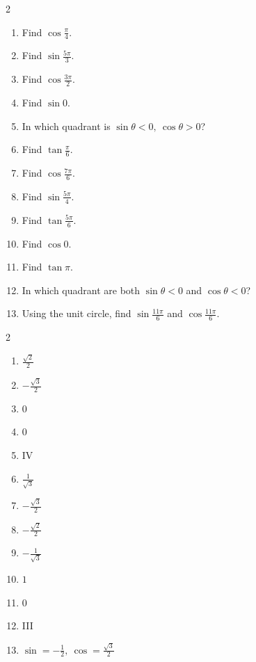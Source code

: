 \documentclass[11pt]{article}
\begin{document}
\begin{recapbox}
\begin{multicols}{2}
\small
\begin{enumerate}[leftmargin=*,itemsep=3pt]
  \item Find $\cos\tfrac{\pi}{4}$.
  \item Find $\sin\tfrac{5\pi}{3}$.
  \item Find $\cos\tfrac{3\pi}{2}$.
  \item Find $\sin 0$.
  \item In which quadrant is $\sin\theta<0,\ \cos\theta>0$?
  \item Find $\tan\tfrac{\pi}{6}$.
  \item Find $\cos\tfrac{7\pi}{6}$.
  \item Find $\sin\tfrac{5\pi}{4}$.
  \item Find $\tan\tfrac{5\pi}{6}$.
  \item Find $\cos 0$.
  \item Find $\tan\pi$.
  \item In which quadrant are both $\sin\theta<0$ and $\cos\theta<0$?
  \item Using the unit circle, find $\sin\tfrac{11\pi}{6}$ and $\cos\tfrac{11\pi}{6}$.
\end{enumerate}
\end{multicols}
\end{recapbox}

\begin{keybox}
\begin{multicols}{2}
\small
\begin{enumerate}[leftmargin=*,itemsep=3pt]
  \item $\tfrac{\sqrt2}{2}$
  \item $-\tfrac{\sqrt3}{2}$
  \item $0$
  \item $0$
  \item IV
  \item $\tfrac{1}{\sqrt3}$
  \item $-\tfrac{\sqrt3}{2}$
  \item $-\tfrac{\sqrt2}{2}$
  \item $-\tfrac{1}{\sqrt3}$
  \item $1$
  \item $0$
  \item III
  \item $\sin=-\tfrac12,\ \cos=\tfrac{\sqrt3}{2}$
\end{enumerate}
\end{multicols}
\end{keybox}
\end{document}
